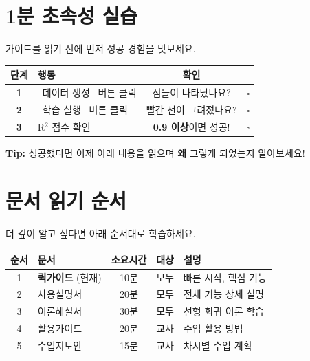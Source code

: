 \documentclass[11pt, a4paper]{article}
\begin{document}
\section{1분 초속성 실습}

\begin{successbox}[지금 바로 해보세요!]
가이드를 읽기 전에 먼저 성공 경험을 맛보세요.
\end{successbox}

\vspace{0.5cm}

\begin{center}
\begin{tabular}{clcc}
    \toprule
    \textbf{단계} & \textbf{행동} & \textbf{확인} & \\
    \midrule
    \textbf{1} & \colorbox{applered}{\color{white}\small\ 데이터 생성\ } 버튼 클릭 & 점들이 나타났나요? & $\square$ \\[3pt]
    \textbf{2} & \colorbox{applegreen}{\color{white}\small\ 학습 실행\ } 버튼 클릭 & 빨간 선이 그려졌나요? & $\square$ \\[3pt]
    \textbf{3} & R$^2$ 점수 확인 & \textbf{0.9 이상}이면 성공! & $\square$ \\
    \bottomrule
\end{tabular}
\end{center}

\vspace{0.5cm}

\begin{tipbox}
\textbf{Tip:} 성공했다면 이제 아래 내용을 읽으며 \textbf{왜} 그렇게 되었는지 알아보세요!
\end{tipbox}

\section{문서 읽기 순서}

더 깊이 알고 싶다면 아래 순서대로 학습하세요.

\vspace{0.3cm}

\begin{center}
\begin{tabular}{clccl}
    \toprule
    \textbf{순서} & \textbf{문서} & \textbf{소요시간} & \textbf{대상} & \textbf{설명} \\
    \midrule
    1 & \textbf{퀵가이드} (현재) & 10분 & 모두 & 빠른 시작, 핵심 기능 \\
    2 & 사용설명서 & 20분 & 모두 & 전체 기능 상세 설명 \\
    3 & 이론해설서 & 30분 & 모두 & 선형 회귀 이론 학습 \\
    4 & 활용가이드 & 20분 & 교사 & 수업 활용 방법 \\
    5 & 수업지도안 & 15분 & 교사 & 차시별 수업 계획 \\
    \bottomrule
\end{tabular}
\end{center}
\end{document}
